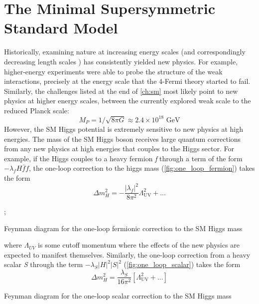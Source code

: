 \chapter{The Minimal Supersymmetric Standard Model}\label{ch:supersymmetry}

Historically, examining nature at increasing energy scales (and correspondingly decreasing length scales ) has consistently yielded new physics. For example, higher-energy experiments were able to probe the structure of the weak interactions, precisely at the energy scale that the 4-Fermi theory started to fail. Similarly, the challenges listed at the end of \autoref{ch:sm} most likely point to new physics at higher energy scales, between the currently explored weak scale to the reduced Planck scale:
\begin{equation*}
M_P = 1/\sqrt{8\pi G} \approx 2.4\times 10^{18} \text{ GeV}
\end{equation*}
However, the SM Higgs potential is extremely sensitive to new physics at high energies. The mass of the SM Higgs boson receives large quantum corrections from any new physics at high energies that couples to the Higgs sector. For example, if the Higgs couples to a heavy fermion \emph{f} through a term of the form $-\lambda_fH\bar{f}f$, the one-loop correction to the higgs mass (\autoref{fig:one_loop_fermion}) takes the form
\begin{equation}
\Delta m_H^2 = -\frac{|\lambda_f|^2}{8\pi^2}\Lambda_\text{UV}^2 + ...
\label{eq:one_loop_fermion}
\end{equation}
\begin{marginfigure}
;
\caption{Feynman diagram for the one-loop fermionic correction to the SM Higgs mass}
\label{fig:one_loop_fermion}
\end{marginfigure}
where $\Lambda_{UV}$ is some cutoff momentum where the effects of the new physics are expected to manifest themselves. Similarly, the one-loop correction from a heavy scalar \emph{S} through the term $-\lambda_S|H|^2|S|^2$ (\autoref{fig:one_loop_scalar}) takes the form
\begin{equation}
  \Delta m_H^2 = \frac{\lambda_S}{16\pi^2}\left[\Lambda_\text{UV}^2 + ...\right]
\label{eq:one_loop_scalar}
\end{equation}
\begin{marginfigure}
\caption{Feynman diagram for the one-loop scalar correction to the SM Higgs mass}
\label{fig:one_loop_scalar}
\end{marginfigure}
